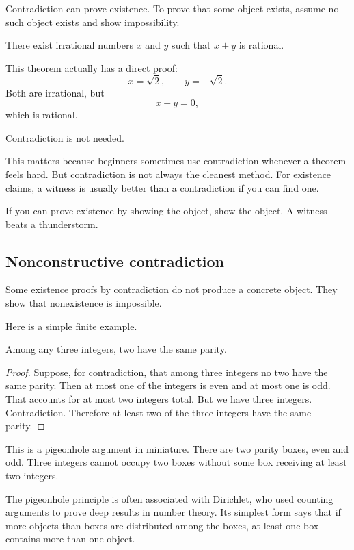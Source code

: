 Contradiction can prove existence. To prove that some object exists, assume no such object exists and show impossibility.

\begin{theorem}
There exist irrational numbers $x$ and $y$ such that $x+y$ is rational.
\end{theorem}

This theorem actually has a direct proof:
\[
x=\sqrt2,\qquad y=-\sqrt2.
\]
Both are irrational, but
\[
x+y=0,
\]
which is rational.

Contradiction is not needed.

This matters because beginners sometimes use contradiction whenever a theorem feels hard. But contradiction is not always the cleanest method. For existence claims, a witness is usually better than a contradiction if you can find one.

\begin{focusbox}
If you can prove existence by showing the object, show the object. A witness beats a thunderstorm.
\end{focusbox}

\subsection{Nonconstructive contradiction}

Some existence proofs by contradiction do not produce a concrete object. They show that nonexistence is impossible.

Here is a simple finite example.

\begin{theorem}
Among any three integers, two have the same parity.
\end{theorem}

\begin{proof}
Suppose, for contradiction, that among three integers no two have the same parity. Then at most one of the integers is even and at most one is odd. That accounts for at most two integers total. But we have three integers. Contradiction. Therefore at least two of the three integers have the same parity.
\end{proof}

This is a pigeonhole argument in miniature. There are two parity boxes, even and odd. Three integers cannot occupy two boxes without some box receiving at least two integers.

\begin{historybox}
The pigeonhole principle is often associated with Dirichlet, who used counting arguments to prove deep results in number theory. Its simplest form says that if more objects than boxes are distributed among the boxes, at least one box contains more than one object.
\end{historybox}

